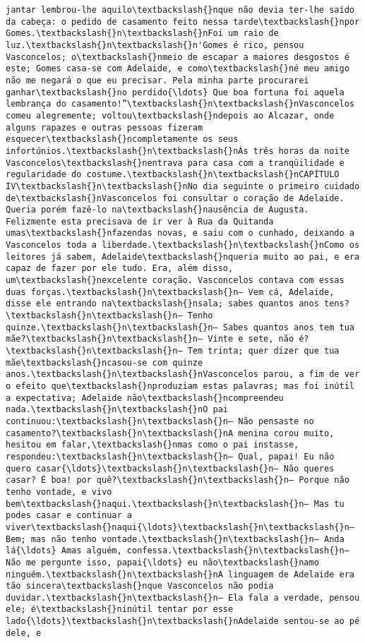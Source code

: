 \documentclass[11pt]{article}
\begin{document}
\begin{Verbatim}[commandchars=\\\{\}]
jantar lembrou-lhe aquilo\textbackslash{}nque não devia ter-lhe saído da cabeça: o pedido de casamento feito nessa tarde\textbackslash{}npor Gomes.\textbackslash{}n\textbackslash{}nFoi um raio de luz.\textbackslash{}n\textbackslash{}n'Gomes é rico, pensou Vasconcelos; o\textbackslash{}nmeio de escapar a maiores desgostos é este; Gomes casa-se com Adelaide, e como\textbackslash{}né meu amigo não me negará o que eu precisar. Pela minha parte procurarei ganhar\textbackslash{}no perdido{\ldots} Que boa fortuna foi aquela lembrança do casamento!”\textbackslash{}n\textbackslash{}nVasconcelos comeu alegremente; voltou\textbackslash{}ndepois ao Alcazar, onde alguns rapazes e outras pessoas fizeram esquecer\textbackslash{}ncompletamente os seus infortúnios.\textbackslash{}n\textbackslash{}nÀs três horas da noite Vasconcelos\textbackslash{}nentrava para casa com a tranqüilidade e regularidade do costume.\textbackslash{}n\textbackslash{}nCAPÍTULO IV\textbackslash{}n\textbackslash{}nNo dia seguinte o primeiro cuidado de\textbackslash{}nVasconcelos foi consultar o coração de Adelaide. Queria porém fazê-lo na\textbackslash{}nausência de Augusta. Felizmente esta precisava de ir ver à Rua da Quitanda umas\textbackslash{}nfazendas novas, e saiu com o cunhado, deixando a Vasconcelos toda a liberdade.\textbackslash{}n\textbackslash{}nComo os leitores já sabem, Adelaide\textbackslash{}nqueria muito ao pai, e era capaz de fazer por ele tudo. Era, além disso, um\textbackslash{}nexcelente coração. Vasconcelos contava com essas duas forças.\textbackslash{}n\textbackslash{}n— Vem cá, Adelaide, disse ele entrando na\textbackslash{}nsala; sabes quantos anos tens?\textbackslash{}n\textbackslash{}n— Tenho quinze.\textbackslash{}n\textbackslash{}n— Sabes quantos anos tem tua mãe?\textbackslash{}n\textbackslash{}n— Vinte e sete, não é?\textbackslash{}n\textbackslash{}n— Tem trinta; quer dizer que tua mãe\textbackslash{}ncasou-se com quinze anos.\textbackslash{}n\textbackslash{}nVasconcelos parou, a fim de ver o efeito que\textbackslash{}nproduziam estas palavras; mas foi inútil a expectativa; Adelaide não\textbackslash{}ncompreendeu nada.\textbackslash{}n\textbackslash{}nO pai continuou:\textbackslash{}n\textbackslash{}n— Não pensaste no casamento?\textbackslash{}n\textbackslash{}nA menina corou muito, hesitou em falar,\textbackslash{}nmas como o pai instasse, respondeu:\textbackslash{}n\textbackslash{}n— Qual, papai! Eu não quero casar{\ldots}\textbackslash{}n\textbackslash{}n— Não queres casar? É boa! por quê?\textbackslash{}n\textbackslash{}n— Porque não tenho vontade, e vivo bem\textbackslash{}naqui.\textbackslash{}n\textbackslash{}n— Mas tu podes casar e continuar a viver\textbackslash{}naqui{\ldots}\textbackslash{}n\textbackslash{}n— Bem; mas não tenho vontade.\textbackslash{}n\textbackslash{}n— Anda lá{\ldots} Amas alguém, confessa.\textbackslash{}n\textbackslash{}n— Não me pergunte isso, papai{\ldots} eu não\textbackslash{}namo ninguém.\textbackslash{}n\textbackslash{}nA linguagem de Adelaide era tão sincera\textbackslash{}nque Vasconcelos não podia duvidar.\textbackslash{}n\textbackslash{}n— Ela fala a verdade, pensou ele; é\textbackslash{}ninútil tentar por esse lado{\ldots}\textbackslash{}n\textbackslash{}nAdelaide sentou-se ao pé dele, e 
\end{Verbatim}
\end{document}
